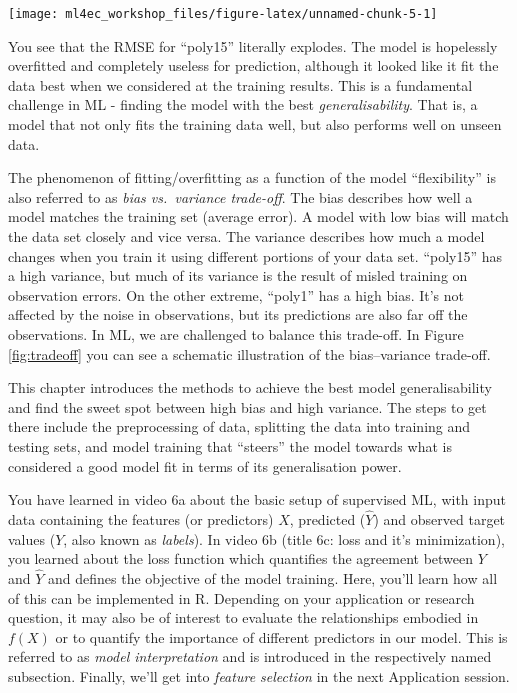 \documentclass[
]{book}
\begin{document}
\begin{center}\texttt{[image: ml4ec\_workshop\_files/figure-latex/unnamed-chunk-5-1]} \end{center}

You see that the RMSE for ``poly15'' literally explodes. The model is hopelessly overfitted and completely useless for prediction, although it looked like it fit the data best when we considered at the training results. This is a fundamental challenge in ML - finding the model with the best \emph{generalisability}. That is, a model that not only fits the training data well, but also performs well on unseen data.

The phenomenon of fitting/overfitting as a function of the model ``flexibility'' is also referred to as \emph{bias vs.~variance trade-off}. The bias describes how well a model matches the training set (average error). A model with low bias will match the data set closely and vice versa. The variance describes how much a model changes when you train it using different portions of your data set. ``poly15'' has a high variance, but much of its variance is the result of misled training on observation errors. On the other extreme, ``poly1'' has a high bias. It's not affected by the noise in observations, but its predictions are also far off the observations. In ML, we are challenged to balance this trade-off. In Figure \ref{fig:tradeoff} you can see a schematic illustration of the bias--variance trade-off.

This chapter introduces the methods to achieve the best model generalisability and find the sweet spot between high bias and high variance. The steps to get there include the preprocessing of data, splitting the data into training and testing sets, and model training that ``steers'' the model towards what is considered a good model fit in terms of its generalisation power.

You have learned in video 6a about the basic setup of supervised ML, with input data containing the features (or predictors) \(X\), predicted (\(\hat{Y}\)) and observed target values (\(Y\), also known as \emph{labels}). In video 6b (title 6c: loss and it's minimization), you learned about the loss function which quantifies the agreement between \(Y\) and \(\hat{Y}\) and defines the objective of the model training. Here, you'll learn how all of this can be implemented in R. Depending on your application or research question, it may also be of interest to evaluate the relationships embodied in \(f(X)\) or to quantify the importance of different predictors in our model. This is referred to as \emph{model interpretation} and is introduced in the respectively named subsection. Finally, we'll get into \emph{feature selection} in the next Application session.
\end{document}
